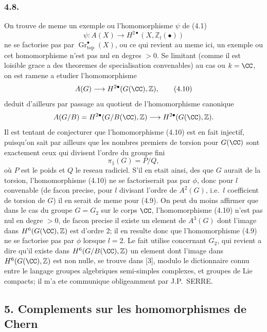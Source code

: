 \subsubsection*{4.8.}
On trouve de meme un exemple ou l'homomorphisme $\psi$ de (4.1)
\[
\psi : A(X) \longrightarrow H^{2\bullet}(X, \mathbb{Z}_l(\bullet)) \tag{4.9}
\]
ne se factorise pas par $\operatorname{Gr}_{\mathrm{top}}^{\bullet}(X)$, ou ce qui revient au meme ici, un exemple ou cet homomorphisme n'est pas nul en degres $> 0$. Se limitant (comme il est loisible grace a des theoremes de specialisation convenables) au cas ou $k = \CC$, on est ramene a etudier l'homomorphisme
\[
A(G) \longrightarrow H^{2\bullet}(G(\CC), \mathbb{Z}), \tag{4.10}
\]
deduit d'ailleurs par passage au quotient de l'homomorphisme canonique
\[
A(G/B) = H^{2\bullet}(G/B(\CC), \mathbb{Z}) \longrightarrow H^{2\bullet}(G(\CC), \mathbb{Z}).
\]
Il est tentant de conjecturer que l'homomorphisme (4.10) est en fait injectif, puisqu'on sait par ailleurs que les nombres premiers de torsion pour $G(\CC)$ sont exactement ceux qui divisent l'ordre du groupe fini
\[
\pi_1(G) = P/Q,
\]
o\`u $P$ est le poids et $Q$ le reseau radiciel. S'il en etait ainsi, des que $G$ aurait de la torsion, l'homomorphisme (4.10) ne se factoriserait pas par $\phi$, donc pour $l$ convenable (de facon precise, pour $l$ divisant l'ordre de $A^{2}(G)$, i.e.\ $l$ coefficient de torsion de $G$) il en serait de meme pour (4.9). On peut du moins affirmer que dans le cas du groupe $G = G_2$ sur le corps $\CC$, l'homomorphisme (4.10) n'est pas nul en degre $> 0$, de facon precise il existe un element de $A^{3}(G)$ dont l'image dans $H^{6}(G(\CC), \mathbb{Z})$ est d'ordre 2; il en resulte donc que l'homomorphisme (4.9) ne se factorise pas par $\phi$ lorsque $l = 2$. Le fait utilise concernant $G_2$, qui revient a dire qu'il existe dans $H^{6}(G/B(\CC), \mathbb{Z})$ un element dont l'image dans $H^{6}(G(\CC), \mathbb{Z})$ est non nulle, se trouve dans [3], modulo le dictionnaire connu entre le langage groupes algebriques semi-simples complexes, et groupes de Lie compacts; il m'a ete communique obligeamment par J.P.\ SERRE.

\subsection*{5. Complements sur les homomorphismes de Chern}

